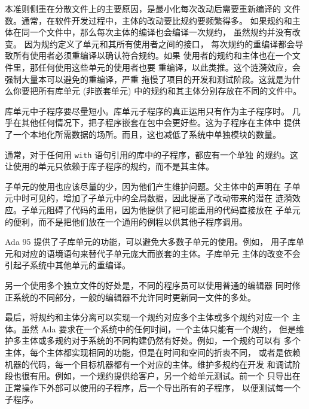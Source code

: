 \begin{blockindent}
本准则侧重在分散文件上的主要原因，是最小化每次改动后需要重新编译的
文件数。通常，在软件开发过程中，主体的改动要比规约要频繁得多。
如果规约和主体在同一个文件中，那么每次主体的编译也会编译一次规约，
虽然规约并没有改变。 因为规约定义了单元和其所有使用者之间的接口，
每次规约的重编译都会导致所有使用者必须重编译以确认符合规约。如果
使用者的规约和主体也在一个文件里，那任何使用这些单元的使用者也要
重编译，以此类推。这个涟漪效应，会强制大量本可以避免的重编译，严重
拖慢了项目的开发和测试阶段。这就是为什么你要把所有库单元 (非嵌套单元)
中的规约和其主体分别存放在不同的文件中。

库单元中子程序要尽量短小。库单元子程序的真正运用只有作为主子程序时。
几乎在其他任何情况下，把子程序嵌套在包中会更好些。这为子程序在主体中
提供了一个本地化所需数据的场所。而且，这也减低了系统中单独模块的数量。

通常，对于任何用 \texttt{with} 语句引用的库中的子程序，都应有一个单独
的规约。这让使用的单元只依赖于库子程序的规约，而不是其主体。

子单元的使用也应该尽量的少，因为他们产生维护问题。父主体中的声明在
子单元中时可见的，增加了子单元中的全局数据，因此提高了改动带来的潜在
涟漪效应。子单元阻碍了代码的重用，因为他提供了把可能重用的代码直接放在
子单元的便利，而不是把他们放在一个通用的例程以供其他子程序调用。

Ada 95 提供了子库单元的功能，可以避免大多数子单元的使用。例如，
用子库单元和对应的语境语句来替代子单元庞大而嵌套的主体。子库单元
主体的改变不会引起子系统中其他单元的重编译。

另一个使用多个独立文件的好处是，不同的程序员可以使用普通的编辑器
同时修正系统的不同部分，一般的编辑器不允许同时更新同一文件的多处。

最后，将规约和主体分离可以实现一个规约对应多个主体或多个规约对应一个
主体。虽然 Ada 要求在一个系统中的任何时间，一个主体只能有一个规约，
但是维护多主体或多规约对于系统的不同构建仍然有好处。例如，一个规约可以有
多个主体，每个主体都实现相同的功能，但是在时间和空间的折衷不同，
或者是依赖机器的代码，每一个目标机器都有一个对应的主体。维护多规约在开发
和调试阶段也很有用。例如，一个规约提供给客户，另一个给单元测试。前一个
只导出在正常操作下外部可以使用的子程序，后一个导出所有的子程序，
以便测试每一个子程序。

\end{blockindent}

